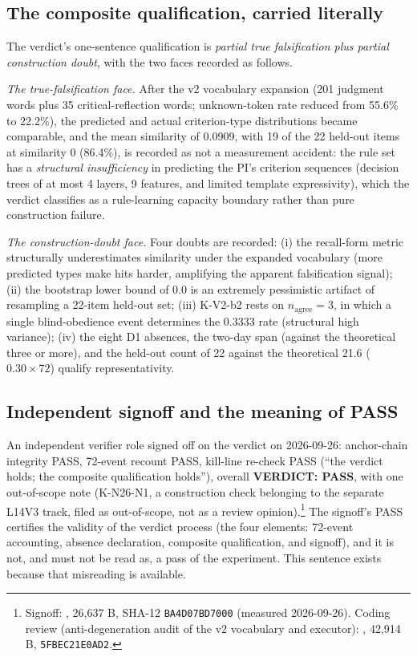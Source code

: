 \documentclass[11pt]{article}
\newcommand{\sha}[1]{\texttt{#1}}
\begin{document}
\subsection{The composite qualification, carried literally}

The verdict's one-sentence qualification is \emph{partial true falsification plus partial construction doubt}, with the two faces recorded as follows.

\emph{The true-falsification face.} After the v2 vocabulary expansion (201 judgment words plus 35 critical-reflection words; unknown-token rate reduced from 55.6\% to 22.2\%), the predicted and actual criterion-type distributions became comparable, and the mean similarity of 0.0909, with 19 of the 22 held-out items at similarity 0 (86.4\%), is recorded as not a measurement accident: the rule set has a \emph{structural insufficiency} in predicting the PI's criterion sequences (decision trees of at most 4 layers, 9 features, and limited template expressivity), which the verdict classifies as a rule-learning capacity boundary rather than pure construction failure.

\emph{The construction-doubt face.} Four doubts are recorded: (i) the recall-form metric structurally underestimates similarity under the expanded vocabulary (more predicted types make hits harder, amplifying the apparent falsification signal); (ii) the bootstrap lower bound of 0.0 is an extremely pessimistic artifact of resampling a 22-item held-out set; (iii) K-V2-b2 rests on $n_{\mathrm{agree}} = 3$, in which a single blind-obedience event determines the 0.3333 rate (structural high variance); (iv) the eight D1 absences, the two-day span (against the theoretical three or more), and the held-out count of 22 against the theoretical 21.6 ($0.30 \times 72$) qualify representativity.

\subsection{Independent signoff and the meaning of PASS}

An independent verifier role signed off on the verdict on 2026-09-26: anchor-chain integrity PASS, 72-event recount PASS, kill-line re-check PASS (``the verdict holds; the composite qualification holds''), overall \textbf{VERDICT: PASS}, with one out-of-scope note (K-N26-N1, a construction check belonging to the separate L14V3 track, filed as out-of-scope, not as a review opinion).\footnote{Signoff: , 26{,}637 B, SHA-12 \sha{BA4D07BD7000} (measured 2026-09-26). Coding review (anti-degeneration audit of the v2 vocabulary and executor): , 42{,}914 B, \sha{5FBEC21E0AD2}.} The signoff's PASS certifies the validity of the verdict process (the four elements: 72-event accounting, absence declaration, composite qualification, and signoff), and it is not, and must not be read as, a pass of the experiment. This sentence exists because that misreading is available.
\end{document}
